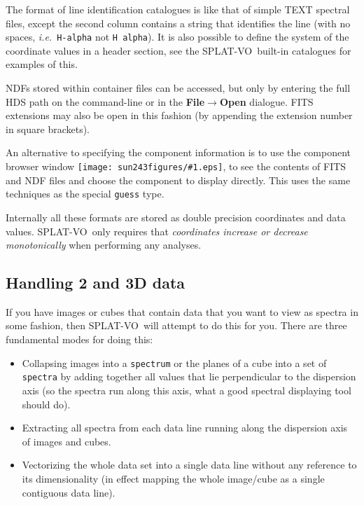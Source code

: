 \documentclass[twoside,11pt]{article}
\newcommand{\htmladdimg}[1]{}
\newcommand{\latexhtml}[2]{#1}
\renewcommand{\_}{\texttt{\symbol{95}}}
\newcommand{\SPLAT}{\textsf{SPLAT-VO}}
\newcommand{\inline}[1]
        {\latexhtml{\texttt{[image: sun243\_figures/\#1.eps]}}
        {\htmladdimg[align=center]{#1.gif}}}
\newcommand{\submenuitem}[2]{\latexhtml{\textbf{#1$\rightarrow$#2}}{\textbf{#1->#2}}}
\newcommand{\hitext}[1]{\texttt{#1}}
\newcommand{\ie}{\textit{i.e.}}
\begin{document}
The format of line identification catalogues is like that of simple TEXT
spectral files, except the second column contains a string that identifies the
line (with no spaces, \ie\ \hitext{H-alpha} not \hitext{H alpha}). It is also
possible to define the system of the coordinate values in a header section,
see the \SPLAT\ built-in catalogues for examples of this.

NDFs stored within container files can be accessed, but only by entering the
full HDS path on the command-line or in the \submenuitem{File}{Open} dialogue.
FITS extensions may also be open in this fashion (by appending the extension
number in square brackets).

An alternative to specifying the component information is to use the component
browser window \inline{browse}, to see the contents of FITS and NDF files and
choose the component to display directly. This uses the same techniques as the
special \hitext{guess} type.

Internally all these formats are stored as double precision
coordinates and data values. \SPLAT\ only requires that
\textit{coordinates increase or decrease monotonically}
when performing any analyses.

\subsection{Handling 2 and 3D data}

If you have images or cubes that contain data that you want to view as spectra
in some fashion, then \SPLAT\ will attempt to do this for you. There are three
fundamental modes for doing this:
\begin{itemize}

\item Collapsing images into a \hitext{spectrum} or the planes of a cube into
a set of \hitext{spectra} by adding together all values that lie perpendicular
to the dispersion axis (so the spectra run along this axis, what a good
spectral displaying tool should do).

\item Extracting all spectra from each data line running along the
dispersion axis of images and cubes.

\item Vectorizing the whole data set into a single data line without any
reference to its dimensionality (in effect mapping the whole image/cube as a
single contiguous data line).

\end{itemize}
\end{document}
